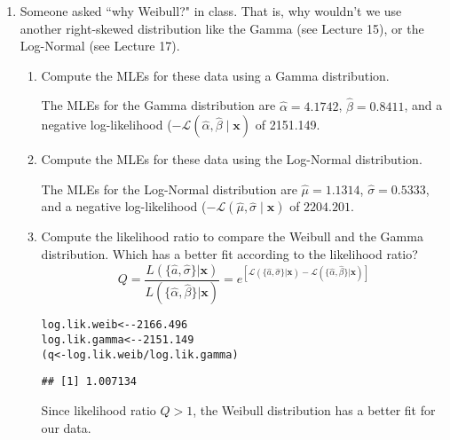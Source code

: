 \documentclass{article}\usepackage[]{graphicx}\usepackage[]{xcolor}
\makeatletter
\newcommand{\hlnum}[1]{\textcolor[rgb]{0.686,0.059,0.569}{#1}}%
\newcommand{\hlopt}[1]{\textcolor[rgb]{0,0,0}{#1}}%
\newcommand{\hldef}[1]{\textcolor[rgb]{0.345,0.345,0.345}{#1}}%
\newcommand{\hlkwb}[1]{\textcolor[rgb]{0.69,0.353,0.396}{#1}}%
\newenvironment{kframe}{%
 \def\at@end@of@kframe{}%
 \ifinner\ifhmode%
  \def\at@end@of@kframe{\end{minipage}}%
  \begin{minipage}{\columnwidth}%
 \fi\fi%
 \def\FrameCommand##1{\hskip\@totalleftmargin \hskip-\fboxsep
 \colorbox{shadecolor}{##1}\hskip-\fboxsep
     \hskip-\linewidth \hskip-\@totalleftmargin \hskip\columnwidth}%
 \MakeFramed {\advance\hsize-\width
   \@totalleftmargin\z@ \linewidth\hsize
   \@setminipage}}%
 {\par\unskip\endMakeFramed%
 \at@end@of@kframe}
\newenvironment{knitrout}{}{} %
\makeatother
\begin{document}
\begin{enumerate}
  \item Someone asked ``why Weibull?" in class. That is, why wouldn't we use 
  another right-skewed distribution like the Gamma (see Lecture 15), or
  the Log-Normal (see Lecture 17).
  \begin{enumerate}
    \item Compute the MLEs for these data using a Gamma distribution. 
    
    The MLEs for the Gamma distribution are $\hat{\alpha} = 4.1742$, $\hat{\beta} = 0.8411$, and a negative log-likelihood ($-\mathcal{L}(\hat{\alpha}, \hat{\beta} \mid \mathbf{x})$ of 2151.149.
    
    \item Compute the MLEs for these data using the Log-Normal distribution.
    
    The MLEs for the Log-Normal distribution are $\hat{\mu} = 1.1314$, $\hat{\sigma} = 0.5333$, and a negative log-likelihood ($-\mathcal{L}(\hat{\mu}, \hat{\sigma} \mid \mathbf{x})$ of $2204.201$.
    
    \item Compute the likelihood ratio to compare the Weibull and the Gamma distribution. 
    Which has a better fit according to the likelihood ratio?
    \[Q = \frac{L(\{\hat{a}, \hat{\sigma}\}|\mathbf{x})}{L(\{\hat{\alpha}, \hat{\beta}\}|\mathbf{x})}=e^{\left[\mathcal{L}(\{\hat{a}, \hat{\sigma}\}|\mathbf{x}) - \mathcal{L}(\{\hat{\alpha}, \hat{\beta}\}|\mathbf{x})\right]}\]
\begin{knitrout}\scriptsize
{}\color{fgcolor}\begin{kframe}
\begin{alltt}
\hldef{log.lik.weib} \hlkwb{<-} \hlopt{-}\hlnum{2166.496}
\hldef{log.lik.gamma} \hlkwb{<-} \hlopt{-}\hlnum{2151.149}
\hldef{(q} \hlkwb{<-} \hldef{log.lik.weib} \hlopt{/} \hldef{log.lik.gamma)}
\end{alltt}
\begin{verbatim}
## [1] 1.007134
\end{verbatim}
\end{kframe}
\end{knitrout}
  Since likelihood ratio $Q > 1$, the Weibull distribution has a better fit for our data. 
  

\end{enumerate}
\end{enumerate}
\end{document}
